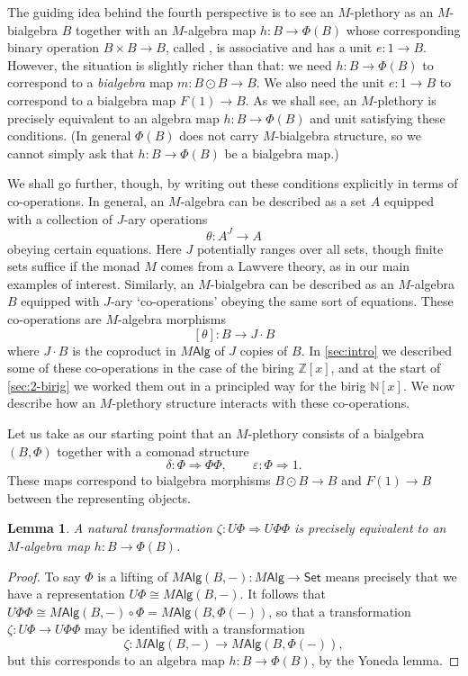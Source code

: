 \documentclass[12pt,reqno]{amsart}
\theoremstyle{plain}
\newtheorem{lem}[thm]{Lemma}
\theoremstyle{definition}
\theoremstyle{remark}
\newcommand{\define}[1]{{\bf \boldmath{#1}}\index{#1}}
\newcommand{\maps}{\colon}
\newcommand{\To}{\Rightarrow}
\newcommand{\N}{\mathbb N}
\newcommand{\Z}{\mathbb Z}
\newcommand{\namedcat}[1]{\mathsf{#1}}
\newcommand{\Alg}{\namedcat{Alg}}
\newcommand{\Set}{\namedcat{Set}}
\numberwithin{thm}{section}
\begin{document}
The guiding idea behind the fourth perspective is to see an $M$-plethory as an $M$-bialgebra $B$ together with an $M$-algebra map $h \maps B \to \Phi(B)$ whose corresponding binary operation $B \times B \to B$, called \define{plethysm}, is associative and has a unit $e \maps 1 \to B$. However, the situation is slightly richer than that: we need $h \maps B \to \Phi(B)$ to correspond to a \emph{bialgebra} map $m \maps B \odot B \to B$. We also need the unit $e \maps 1 \to B$ to correspond to a bialgebra map $F(1) \to B$. As we shall see, an $M$-plethory is precisely equivalent to an algebra map $h \maps B \to \Phi(B)$ and unit satisfying these conditions. (In general $\Phi(B)$ does not carry $M$-bialgebra structure, so we cannot simply ask that $h \maps B \to \Phi(B)$ be a bialgebra map.)

We shall go further, though, by writing out these conditions explicitly in terms of co-operations. In general, an $M$-algebra can be described as a set $A$ equipped with a collection of $J$-ary operations
\[    \theta \maps A^J \to A \]
obeying certain equations. Here $J$ potentially ranges over all sets, though finite sets suffice if the monad $M$ comes from a Lawvere theory, as in our main examples of interest. Similarly, an $M$-bialgebra can be described as an $M$-algebra $B$ equipped with $J$-ary `co-operations' obeying the same sort of equations. These co-operations are $M$-algebra morphisms
\[    [\theta] \maps B \to J \cdot B \]
where $J \cdot B$ is the coproduct in $M\Alg$ of $J$ copies of $B$. In \cref{sec:intro} we described some of these co-operations in the case of the biring $\Z[x]$, and at the start of \cref{sec:2-birig} we worked them out in a principled way for the birig $\N[x]$. We now describe how an $M$-plethory structure interacts with these co-operations. 

Let us take as our starting point that an $M$-plethory consists of a bialgebra $(B, \Phi)$ together with a comonad structure 
\[
    \delta \maps \Phi \To \Phi\Phi, \qquad \varepsilon \maps \Phi \To 1. 
\]
These maps correspond to bialgebra morphisms $B \odot B \to B$ and $F(1) \to B$ between the representing objects. 

\begin{lem}
\label{lem:M-plethory_h}
    A natural transformation $\zeta \maps U\Phi \To U\Phi\Phi$ is precisely equivalent to an $M$-algebra map $h \maps B \to \Phi(B)$. 
\end{lem}

\begin{proof}
    To say $\Phi$ is a lifting of $M\Alg(B, -) \maps M\Alg \to \Set$ means precisely that we have a representation $U\Phi \cong M\Alg(B, -)$. It follows that $U\Phi\Phi \cong M\Alg(B, -) \circ \Phi = M\Alg(B, \Phi(-))$, so that a transformation $\zeta \maps U\Phi \to U\Phi\Phi$ may be identified with a transformation 
    \[
        \zeta \maps M\Alg(B, -) \to M\Alg(B, \Phi(-)),
    \]
    but this corresponds to an algebra map $h \maps B \to \Phi(B)$, by the Yoneda lemma. 
\end{proof}
\end{document}
